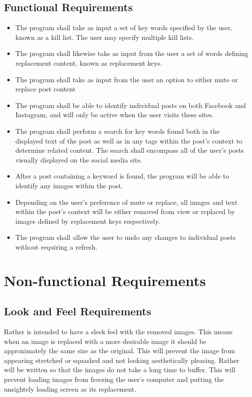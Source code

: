 \documentclass[12pt, titlepage]{article}
\begin{document}
\subsection{Functional Requirements}
\begin{itemize}
  \item The program shall take as input a set of key words specified by the user, known as a kill list. The user may specify multiple kill lists.
  \item The program shall likewise take as input from the user a set of words defining replacement content, known as replacement keys.
  \item The program shall take as input from the user an option to either mute or replace post content
  \item The program shall be able to identify individual posts on both Facebook and Instagram, and will only be active when the user visits these sites.
  \item The program shall perform a search for key words found both in the displayed text of the post as well as in any tags within the post's context to determine related content. The search shall encompass all of the user's posts visually displayed on the social media site.
  \item After a post containing a keyword is found, the program will be able to identify any images within the post.
  \item Depending on the user's preference of mute or replace, all images and text within the post's context will be either removed from view or replaced by images defined by replacement keys respectively.
  \item The program shall allow the user to undo any changes to individual posts without requiring a refresh.
\end{itemize}

\section{Non-functional Requirements}

\subsection{Look and Feel Requirements}
Rather is intended to have a sleek feel with the removed images. This means when an image is replaced with a more desirable image it should be approximately the same size as the original. This will prevent the image from appearing stretched or squashed and not looking aesthetically pleasing. Rather will be written so that the images do not take a long time to buffer. This will prevent loading images from freezing the user's computer and putting the unsightely loading screen as its replacement. 
\end{document}
